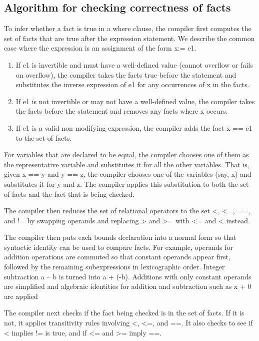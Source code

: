 \subsection{Algorithm for checking correctness of facts}\label{algorithm-for-checking-correctness-of-facts}

To infer whether a fact is true in a where clause, the compiler first
computes the set of facts that are true after the expression statement.
We describe the common case where the expression is an assignment of the
form x:= e1.

\begin{enumerate}
\item
  If e1 is invertible and must have a well-defined value (cannot
  overflow or fails on overflow), the compiler takes the facts true
  before the statement and substitutes the inverse expression of e1 for
  any occurrences of x in the facts.
\item
  If e1 is not invertible or may not have a well-defined value, the
  compiler takes the facts before the statement and removes any facts
  where x occurs.
\item
  If e1 is a valid non-modifying expression, the compiler adds the fact
  x == e1 to the set of facts.
\end{enumerate}

For variables that are declared to be equal, the compiler chooses one of
them as the representative variable and substitutes it for all the other
variables. That is, given x == y and y == z, the compiler chooses one of
the variables (say, x) and substitutes it for y and z. The compiler
applies this substitution to both the set of facts and the fact that is
being checked.

The compiler then reduces the set of relational operators to the set
\textless{}, \textless{}=, ==, and != by swapping operands and replacing
\textgreater{} and \textgreater{}= with \textless{}= and \textless{}
instead.

The compiler then puts each bounds declaration into a normal form so
that syntactic identity can be used to compare facts. For example,
operands for addition operations are commuted so that constant operands
appear first, followed by the remaining subexpressions in lexicographic
order. Integer subtraction a -- b is turned into a + (-b). Additions
with only constant operands are simplified and algebraic identities for
addition and subtraction such as x + 0 are applied

The compiler next checks if the fact being checked is in the set of
facts. If it is not, it applies transitivity rules involving
\textless{}, \textless{}=, and ==. It also checks to see if \textless{}
implies != is true, and if \textless{}= and \textgreater{}= imply ==.


